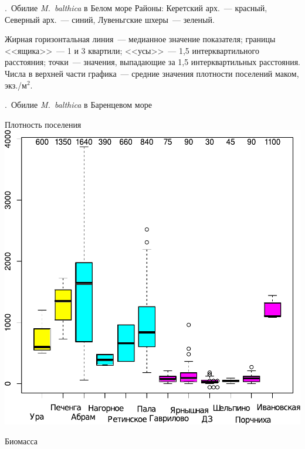 \documentclass[aspectratio=169, xcolor=table]{beamer}
\begin{document}
\begin{frame}{\insertpagenumber.\ Обилие {\it M.~balthica} в Белом море}
{\scriptsize Районы: Керетский арх.~--- красный, Северный арх.~--- синий, Лувеньгские шхеры~--- зеленый.}\\
\begin{tiny} 
Жирная горизонтальная линия~--- медианное значение показателя;
границы <<ящика>>~--- 1 и 3 квартили; <<усы>>~--- 1,5 интерквартильного расстояния;
точки~--- значения, выпадающие за 1,5 интерквартильных расстояния.
Числа в верхней части графика~--- средние значения плотности поселений маком, экз./м$^2$.
\end{tiny}

\end{frame}



\begin{frame}{\insertpagenumber.\ Обилие {\it M.~balthica} в Баренцевом море}
	\begin{minipage}[t]{.49\linewidth}
		\begin{center}
		{\footnotesize Плотность поселения}
			\includegraphics[width=.9\textwidth]{N2_area_Barents2.pdf}
		\end{center}
	\end{minipage}
%
	\begin{minipage}[t]{.49\linewidth}
		\begin{center}
		{\footnotesize Биомасса}

\end{center}
\end{minipage}
\end{frame}
\end{document}
